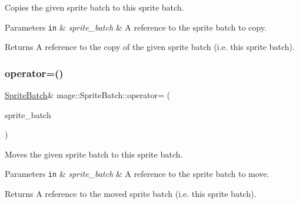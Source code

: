 Copies the given sprite batch to this sprite batch.


\begin{DoxyParams}[1]{Parameters}
\mbox{\tt in}  & {\em sprite\+\_\+batch} & A reference to the sprite batch to copy. \\
\hline
\end{DoxyParams}
\begin{DoxyReturn}{Returns}
A reference to the copy of the given sprite batch (i.\+e. this sprite batch). 
\end{DoxyReturn}
\hypertarget{classmage_1_1_sprite_batch_ad46c172200bf47c10fa13fb3a70a4104}{}\label{classmage_1_1_sprite_batch_ad46c172200bf47c10fa13fb3a70a4104} 
\subsubsection{\texorpdfstring{operator=()}{operator=()}\hspace{0.1cm}{\footnotesize\ttfamily [2/2]}}
{\footnotesize\ttfamily \hyperlink{classmage_1_1_sprite_batch}{Sprite\+Batch}\& mage\+::\+Sprite\+Batch\+::operator= (\begin{DoxyParamCaption}\item[{\hyperlink{classmage_1_1_sprite_batch}{Sprite\+Batch} \&\&}]{sprite\+\_\+batch }\end{DoxyParamCaption})\hspace{0.3cm}{\ttfamily [delete]}}

Moves the given sprite batch to this sprite batch.


\begin{DoxyParams}[1]{Parameters}
\mbox{\tt in}  & {\em sprite\+\_\+batch} & A reference to the sprite batch to move. \\
\hline
\end{DoxyParams}
\begin{DoxyReturn}{Returns}
A reference to the moved sprite batch (i.\+e. this sprite batch). 
\end{DoxyReturn}
\hypertarget{classmage_1_1_sprite_batch_ade27cb47058823566f360356c1e245ec}{}\label{classmage_1_1_sprite_batch_ade27cb47058823566f360356c1e245ec} 

